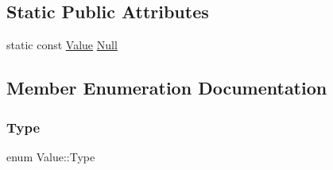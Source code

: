 \subsection*{Static Public Attributes}
\begin{DoxyCompactItemize}
\item 
static const \hyperlink{classValue}{Value} \hyperlink{classValue_af01b27b1c6ca5f4577a4b6c10a186f59}{Null}
\end{DoxyCompactItemize}


\subsection{Member Enumeration Documentation}
\mbox{\label{classValue_a669e0b7bc64c01dbec39297930398541}} 
\subsubsection{\texorpdfstring{Type}{Type}\hspace{0.1cm}{\footnotesize\ttfamily [1/2]}}
{\footnotesize\ttfamily enum Value\+::\+Type\hspace{0.3cm}{\ttfamily [strong]}}


